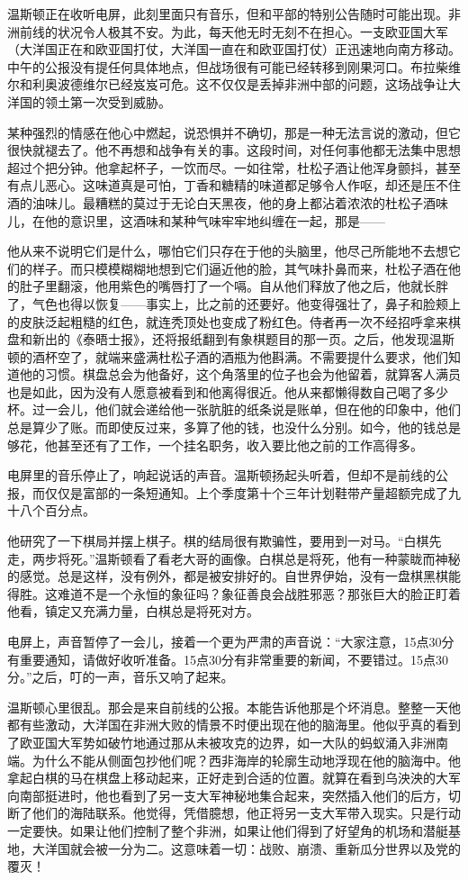 温斯顿正在收听电屏，此刻里面只有音乐，但和平部的特别公告随时可能出现。非洲前线的状况令人极其不安。为此，每天他无时无刻不在担心。一支欧亚国大军（大洋国正在和欧亚国打仗，大洋国一直在和欧亚国打仗）正迅速地向南方移动。中午的公报没有提任何具体地点，但战场很有可能已经转移到刚果河口。布拉柴维尔和利奥波德维尔已经岌岌可危。这不仅仅是丢掉非洲中部的问题，这场战争让大洋国的领土第一次受到威胁。

某种强烈的情感在他心中燃起，说恐惧并不确切，那是一种无法言说的激动，但它很快就褪去了。他不再想和战争有关的事。这段时间，对任何事他都无法集中思想超过个把分钟。他拿起杯子，一饮而尽。一如往常，杜松子酒让他浑身颤抖，甚至有点儿恶心。这味道真是可怕，丁香和糖精的味道都足够令人作呕，却还是压不住酒的油味儿。最糟糕的莫过于无论白天黑夜，他的身上都沾着浓浓的杜松子酒味儿，在他的意识里，这酒味和某种气味牢牢地纠缠在一起，那是------

他从来不说明它们是什么，哪怕它们只存在于他的头脑里，他尽己所能地不去想它们的样子。而只模模糊糊地想到它们逼近他的脸，其气味扑鼻而来，杜松子酒在他的肚子里翻滚，他用紫色的嘴唇打了一个嗝。自从他们释放了他之后，他就长胖了，气色也得以恢复------事实上，比之前的还要好。他变得强壮了，鼻子和脸颊上的皮肤泛起粗糙的红色，就连秃顶处也变成了粉红色。侍者再一次不经招呼拿来棋盘和新出的《泰晤士报》，还将报纸翻到有象棋题目的那一页。之后，他发现温斯顿的酒杯空了，就端来盛满杜松子酒的酒瓶为他斟满。不需要提什么要求，他们知道他的习惯。棋盘总会为他备好，这个角落里的位子也会为他留着，就算客人满员也是如此，因为没有人愿意被看到和他离得很近。他从来都懒得数自己喝了多少杯。过一会儿，他们就会递给他一张肮脏的纸条说是账单，但在他的印象中，他们总是算少了账。而即使反过来，多算了他的钱，也没什么分别。如今，他的钱总是够花，他甚至还有了工作，一个挂名职务，收入要比他之前的工作高得多。

电屏里的音乐停止了，响起说话的声音。温斯顿扬起头听着，但却不是前线的公报，而仅仅是富部的一条短通知。上个季度第十个三年计划鞋带产量超额完成了九十八个百分点。

他研究了一下棋局并摆上棋子。棋的结局很有欺骗性，要用到一对马。``白棋先走，两步将死。''温斯顿看了看老大哥的画像。白棋总是将死，他有一种蒙眬而神秘的感觉。总是这样，没有例外，都是被安排好的。自世界伊始，没有一盘棋黑棋能得胜。这难道不是一个永恒的象征吗？象征善良会战胜邪恶？那张巨大的脸正盯着他看，镇定又充满力量，白棋总是将死对方。

电屏上，声音暂停了一会儿，接着一个更为严肃的声音说：``大家注意，15点30分有重要通知，请做好收听准备。15点30分有非常重要的新闻，不要错过。15点30分。''之后，叮的一声，音乐又响了起来。

温斯顿心里很乱。那会是来自前线的公报。本能告诉他那是个坏消息。整整一天他都有些激动，大洋国在非洲大败的情景不时便出现在他的脑海里。他似乎真的看到了欧亚国大军势如破竹地通过那从未被攻克的边界，如一大队的蚂蚁涌入非洲南端。为什么不能从侧面包抄他们呢？西非海岸的轮廓生动地浮现在他的脑海中。他拿起白棋的马在棋盘上移动起来，正好走到合适的位置。就算在看到乌泱泱的大军向南部挺进时，他也看到了另一支大军神秘地集合起来，突然插入他们的后方，切断了他们的海陆联系。他觉得，凭借臆想，他正将另一支大军带入现实。只是行动一定要快。如果让他们控制了整个非洲，如果让他们得到了好望角的机场和潜艇基地，大洋国就会被一分为二。这意味着一切：战败、崩溃、重新瓜分世界以及党的覆灭！

